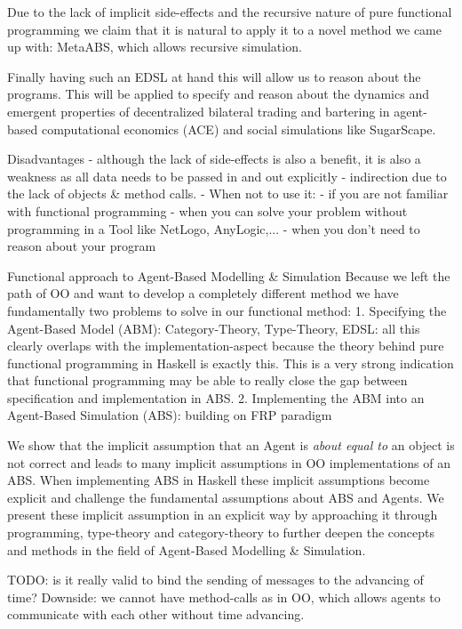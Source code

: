 Due to the lack of implicit side-effects and the recursive nature of pure functional programming we claim that it is natural to apply it to a novel method we came up with: MetaABS, which allows recursive simulation.

Finally having such an EDSL at hand this will allow us to reason about the programs. This will be applied to specify and reason about the dynamics and emergent properties of decentralized bilateral trading and bartering in agent-based computational economics (ACE) and social simulations like SugarScape.

Disadvantages
- although the lack of side-effects is also a benefit, it is also a weakness as all data needs to be passed in and out explicitly 
- indirection due to the lack of objects \& method calls.
- When not to use it: 
	- if you are not familiar with functional programming
	- when you can solve your problem without programming in a Tool like NetLogo, AnyLogic,...
	- when you don't need to reason about your program
	
Functional approach to Agent-Based Modelling \& Simulation
Because we left the path of OO and want to develop a completely different method we have fundamentally two problems to solve in our functional method:
1. Specifying the Agent-Based Model (ABM): Category-Theory, Type-Theory, EDSL: all this clearly overlaps with the  implementation-aspect because the theory behind pure functional programming in Haskell is exactly this. This is a very strong indication that functional programming may be able to really close the gap between specification and implementation in ABS.
2. Implementing the ABM into an Agent-Based Simulation (ABS): building on FRP paradigm

We show that the implicit assumption that an Agent is \textit{about equal to} an object is not correct and leads to many implicit assumptions in OO implementations of an ABS. When implementing ABS in Haskell these implicit assumptions become explicit and challenge the fundamental assumptions about ABS and Agents. We present these implicit assumption in an explicit way by approaching it through programming, type-theory and category-theory to further deepen the concepts and methods in the field of Agent-Based Modelling \& Simulation.

TODO: is it really valid to bind the sending of messages to the advancing of time?
Downside: we cannot have method-calls as in OO, which allows agents to communicate with each other without time advancing. 

